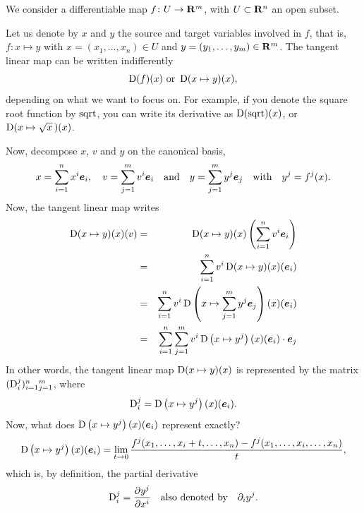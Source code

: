 We consider a differentiable map $f \colon U \to \mathbf{R}^m$,
with $U \subset \mathbf{R}^n$ an open subset.

Let us denote by $x$ and $y$ the source and target variables involved in $f$,
that is,
$f \colon x \mapsto y$ with $x = (x_1,\dots,x_n) \in U$ and $y = (y_1,\dots,y_m) \in \mathbf{R}^m$.
The tangent linear map can be written indifferently
$$%
  \Der(f)(x) \text{ or } \Der(x \mapsto y)(x),
  $$%
depending on what we want to focus on.
For example,
if you denote the square root function by $\operatorname{sqrt}$,
you can write its derivative as $\operatorname{D}(\operatorname{sqrt})(x)$,
or $\operatorname{D}(x \mapsto \sqrt{x}\,)(x)$.

Now,
decompose $x$, $v$ and $y$ on the canonical basis,
$$%
  x = \sum_{i=1}^n x^i \bme_i,
  \quad  v = \sum_{j=1}^m v^i \bme_i
  \quad \text{and} \quad
  y = \sum_{j=1}^m y^j \bme_j
  \quad \text{with} \quad y^j = f^j(x).
  $$%
Now,
the tangent linear map writes
\begin{eqnarray*}\allowdisplaybreaks
  \Der(x \mapsto y)(x)(v) & = & \Der(x \mapsto y)(x)\left(\sum_{i=1}^n v^i \bme_i\right) \\
  & = & \sum_{i=1}^n v^i \Der(x \mapsto y)(x)(\bme_i) \\
  & = & \sum_{i=1}^n v^i \Der\left(x \mapsto \sum_{j=1}^m y^j \bme_j\right)(x)(\bme_i)\\
  & = & \sum_{i=1}^n \sum_{j=1}^m v^i \Der\left(x \mapsto y^j \right)(x)(\bme_i) \cdot \bme_j
\end{eqnarray*}
In other words,
the tangent linear map $\operatorname{D}(x \mapsto y)(x)$ is represented by the matrix $(\operatorname{D}_i^j)_{i = 1}^n{}_{j=1}^m$,
where
$$%
  \Der_i^j = \Der\left(x \mapsto y^j \right)(x)(\bme_i).
  $$%
Now,
what does $\operatorname{D}\left(x \mapsto y^j \right)(x)({\boldsymbol e}_i)$ represent exactly?
$$%
  \Der\left(x \mapsto y^j \right)(x)(\bme_i) =
  \lim_{t\to 0} {f^j(x_1,\ldots,x_i + t,\ldots,x_n) - f^j(x_1,\ldots,x_i,\ldots,x_n) \over t},
  $$%
which is,
by definition,
the partial derivative
$$%
  \Der_i^j = {\partial y^j \over \partial x^i}
  \quad \text{also denoted by} \quad \partial_i y^j.
  $$%

